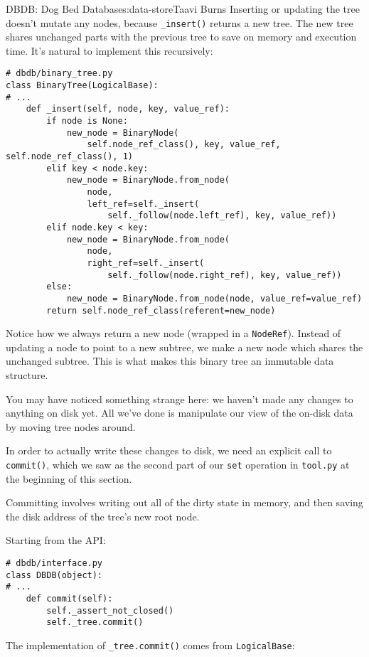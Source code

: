 \begin{aosachapter}{DBDB: Dog Bed Database}{s:data-store}{Taavi Burns}
Inserting or updating the tree doesn't mutate any nodes, because
\texttt{\_insert()} returns a new tree. The new tree shares unchanged
parts with the previous tree to save on memory and execution time. It's
natural to implement this recursively:

\begin{verbatim}
# dbdb/binary_tree.py
class BinaryTree(LogicalBase):
# ...
    def _insert(self, node, key, value_ref):
        if node is None:
            new_node = BinaryNode(
                self.node_ref_class(), key, value_ref, self.node_ref_class(), 1)
        elif key < node.key:
            new_node = BinaryNode.from_node(
                node,
                left_ref=self._insert(
                    self._follow(node.left_ref), key, value_ref))
        elif node.key < key:
            new_node = BinaryNode.from_node(
                node,
                right_ref=self._insert(
                    self._follow(node.right_ref), key, value_ref))
        else:
            new_node = BinaryNode.from_node(node, value_ref=value_ref)
        return self.node_ref_class(referent=new_node)
\end{verbatim}

Notice how we always return a new node (wrapped in a \texttt{NodeRef}).
Instead of updating a node to point to a new subtree, we make a new node
which shares the unchanged subtree. This is what makes this binary tree
an immutable data structure.

You may have noticed something strange here: we haven't made any changes
to anything on disk yet. All we've done is manipulate our view of the
on-disk data by moving tree nodes around.

In order to actually write these changes to disk, we need an explicit
call to \texttt{commit()}, which we saw as the second part of our
\texttt{set} operation in \texttt{tool.py} at the beginning of this
section.

Committing involves writing out all of the dirty state in memory, and
then saving the disk address of the tree's new root node.

Starting from the API:

\begin{verbatim}
# dbdb/interface.py
class DBDB(object):
# ...
    def commit(self):
        self._assert_not_closed()
        self._tree.commit()
\end{verbatim}

The implementation of \texttt{\_tree.commit()} comes from
\texttt{LogicalBase}:


\end{aosachapter}
